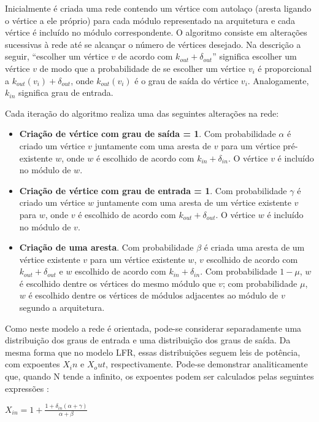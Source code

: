 \documentclass{acm_proc_article-sp}
\begin{document}
Inicialmente é criada uma rede contendo um vértice com autolaço (aresta ligando o vértice a ele próprio) para cada módulo representado na arquitetura e cada vértice é incluído no módulo correspondente. O algoritmo consiste em alterações sucessivas à rede até se alcançar o número de vértices desejado. Na descrição a seguir, ``escolher um vértice $v$ de acordo com $k_{out} + \delta_{out}$'' significa escolher um vértice $v$ de modo que a probabilidade de se escolher um vértice $v_i$ é proporcional a $k_{out}(v_i) + \delta_{out}$, onde $k_{out}(v_i)$ é o grau de saída do vértice $v_i$. Analogamente, $k_{in}$ significa grau de entrada.

Cada iteração do algoritmo realiza uma das seguintes alterações na rede:

\begin{itemize}
  \item \textbf{Criação de vértice com grau de saída = 1}. Com probabilidade $\alpha$ é criado um vértice $v$ juntamente com uma aresta de $v$ para um vértice pré-existente $w$, onde $w$ é escolhido de acordo com $k_{in} + \delta_{in}$. O vértice $v$ é incluído no módulo de $w$.
  \item \textbf{Criação de vértice com grau de entrada = 1}. Com probabilidade $\gamma$ é criado um vértice $w$ juntamente com uma aresta de um vértice existente $v$ para $w$, onde $v$ é escolhido de acordo com $k_{out} + \delta_{out}$. O vértice $w$ é incluído no módulo de $v$.
  \item \textbf{Criação de uma aresta}. Com probabilidade $\beta$ é criada uma aresta de um vértice existente $v$ para um vértice existente $w$, $v$ escolhido de acordo com $k_{out} + \delta_{out}$ e $w$ escolhido de acordo com $k_{in} + \delta_{in}$. Com probabilidade $1 - \mu$, $w$ é escolhido dentre os vértices do mesmo módulo que $v$; com probabilidade $\mu$, $w$ é escolhido dentre os vértices de módulos adjacentes ao módulo de $v$ segundo a arquitetura. 
\end{itemize}

Como neste modelo a rede é orientada, pode-se considerar separadamente uma distribuição dos graus de entrada e uma distribuição dos graus de saída. Da mesma forma que no modelo LFR, essas distribuições seguem leis de potência, com expoentes $X_in$ e $X_out$, respectivamente. Pode-se demonstrar analiticamente que, quando N tende a infinito, os expoentes podem ser calculados pelas seguintes expressões \cite{Bollobas2003}:

$X_{in} = 1 + \frac{1 + \delta_{in}(\alpha + \gamma)}{\alpha + \beta}$
\end{document}
